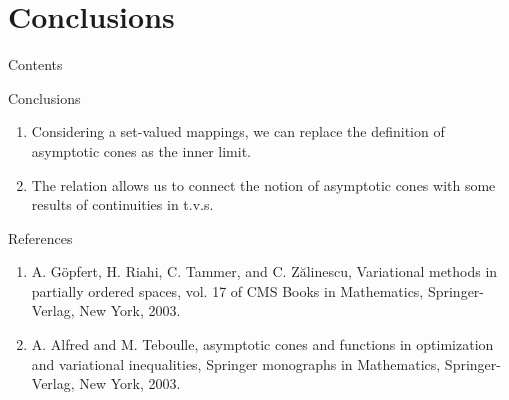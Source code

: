 \documentclass[aspectratio=169, dvipdfmx, 11pt]{beamer} %
\begin{document}
\section{Conclusions}
\begin{frame}{Contents}
    \tableofcontents[currentsection]
\end{frame}

\begin{frame}{Conclusions}
    \begin{enumerate}[]
        \item Considering a set-valued mappings, we can replace the definition of asymptotic cones as the inner limit.
        \item The relation allows us to connect the notion of asymptotic cones with some results of continuities in t.v.s.
    \end{enumerate}
\end{frame}

\begin{frame}[t]{References}
\begin{enumerate}[]
    \item A. G\"{o}pfert, H. Riahi, C. Tammer, and C. Z\u{a}linescu, Variational methods in partially ordered spaces, vol. 17 of CMS Books in Mathematics, Springer-Verlag, New York, 2003.
    \item A. Alfred and M. Teboulle, asymptotic cones and functions in optimization and variational inequalities, Springer monographs in Mathematics, Springer-Verlag, New York, 2003.
\end{enumerate}
\end{frame}
\end{document}
